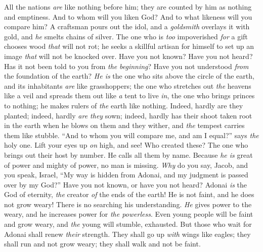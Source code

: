 \begin{biblechapter}
\verse All the nations \textit{are} like nothing before him; 
they are counted by him as nothing and emptiness.
\verse And to whom will you liken God? 
And to what likeness will you compare him?
\verse A craftsman pours out the idol, 
and a \textit{goldsmith} overlays it with gold, 
and \textit{he} smelts chains of silver.
\verse The one who is \textit{too} impoverished \textit{for} a gift chooses wood \textit{that} will not rot; 
he seeks a skillful artisan for himself to set up an image \textit{that} will not be knocked over.
\verse Have you not known? 
Have you not heard? 
Has it not been told to you from \textit{the} \textit{beginning}? 
Have you not understood \textit{from} the foundation of the earth?
\verse \textit{He is} the one who sits above the circle of the earth, 
and its inhabitants \textit{are} like grasshoppers; 
the one who stretches out \textit{the} heavens like a veil 
and spreads them out like \textit{a} tent to live \textit{in},
\verse the one who brings princes to nothing; 
he makes rulers of \textit{the} earth like nothing.
\verse Indeed, hardly are they planted; indeed, hardly \textit{are they} sown; 
indeed, hardly has their shoot taken root in the earth 
when he blows on them and they wither, 
and \textit{the} tempest carries them like stubble.
\verse “And to whom you will compare me, and am I equal?” says \textit{the} holy one.
\verse Lift your eyes up \textit{on} high, and see! Who created these? 
The one who brings out their host by number. 
He calls all them by name. 
Because \textit{he is} great of power 
and mighty of power, no man is missing.
\verse \textit{Why} do you say, Jacob, 
and you speak, Israel, 
“My way is hidden from Adonai, 
and my judgment is passed over by my God?”
\verse Have you not known, 
or have you not heard? 
Adonai \textit{is} the God of eternity, 
\textit{the} creator \textit{of} the ends of the earth! 
He is not faint, and he does not grow weary! 
There is no searching his understanding.
\verse \textit{He} gives power to the weary, 
and he increases power for \textit{the powerless}.
\verse Even young people will be faint and grow weary, 
and \textit{the} young will stumble, exhausted.
\verse But those who wait for Adonai shall renew \textit{their} strength. 
They shall go up \textit{with} wings like eagles; 
they shall run and not grow weary; 
they shall walk and not be faint.
\end{biblechapter}

